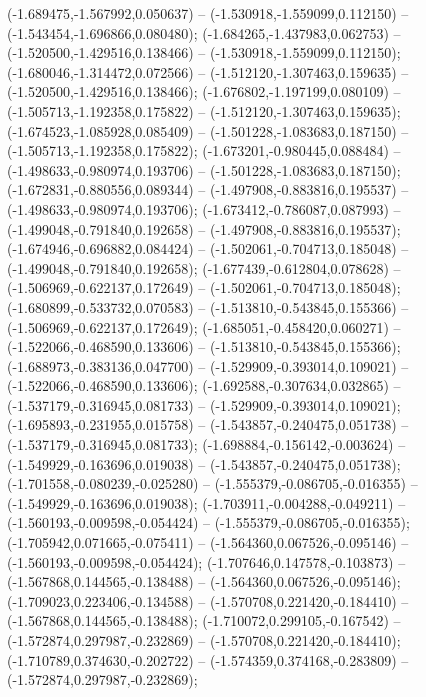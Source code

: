  (-1.689475,-1.567992,0.050637) -- (-1.530918,-1.559099,0.112150) -- (-1.543454,-1.696866,0.080480);
 (-1.684265,-1.437983,0.062753) -- (-1.520500,-1.429516,0.138466) -- (-1.530918,-1.559099,0.112150);
 (-1.680046,-1.314472,0.072566) -- (-1.512120,-1.307463,0.159635) -- (-1.520500,-1.429516,0.138466);
 (-1.676802,-1.197199,0.080109) -- (-1.505713,-1.192358,0.175822) -- (-1.512120,-1.307463,0.159635);
 (-1.674523,-1.085928,0.085409) -- (-1.501228,-1.083683,0.187150) -- (-1.505713,-1.192358,0.175822);
 (-1.673201,-0.980445,0.088484) -- (-1.498633,-0.980974,0.193706) -- (-1.501228,-1.083683,0.187150);
 (-1.672831,-0.880556,0.089344) -- (-1.497908,-0.883816,0.195537) -- (-1.498633,-0.980974,0.193706);
 (-1.673412,-0.786087,0.087993) -- (-1.499048,-0.791840,0.192658) -- (-1.497908,-0.883816,0.195537);
 (-1.674946,-0.696882,0.084424) -- (-1.502061,-0.704713,0.185048) -- (-1.499048,-0.791840,0.192658);
 (-1.677439,-0.612804,0.078628) -- (-1.506969,-0.622137,0.172649) -- (-1.502061,-0.704713,0.185048);
 (-1.680899,-0.533732,0.070583) -- (-1.513810,-0.543845,0.155366) -- (-1.506969,-0.622137,0.172649);
 (-1.685051,-0.458420,0.060271) -- (-1.522066,-0.468590,0.133606) -- (-1.513810,-0.543845,0.155366);
 (-1.688973,-0.383136,0.047700) -- (-1.529909,-0.393014,0.109021) -- (-1.522066,-0.468590,0.133606);
 (-1.692588,-0.307634,0.032865) -- (-1.537179,-0.316945,0.081733) -- (-1.529909,-0.393014,0.109021);
 (-1.695893,-0.231955,0.015758) -- (-1.543857,-0.240475,0.051738) -- (-1.537179,-0.316945,0.081733);
 (-1.698884,-0.156142,-0.003624) -- (-1.549929,-0.163696,0.019038) -- (-1.543857,-0.240475,0.051738);
 (-1.701558,-0.080239,-0.025280) -- (-1.555379,-0.086705,-0.016355) -- (-1.549929,-0.163696,0.019038);
 (-1.703911,-0.004288,-0.049211) -- (-1.560193,-0.009598,-0.054424) -- (-1.555379,-0.086705,-0.016355);
 (-1.705942,0.071665,-0.075411) -- (-1.564360,0.067526,-0.095146) -- (-1.560193,-0.009598,-0.054424);
 (-1.707646,0.147578,-0.103873) -- (-1.567868,0.144565,-0.138488) -- (-1.564360,0.067526,-0.095146);
 (-1.709023,0.223406,-0.134588) -- (-1.570708,0.221420,-0.184410) -- (-1.567868,0.144565,-0.138488);
 (-1.710072,0.299105,-0.167542) -- (-1.572874,0.297987,-0.232869) -- (-1.570708,0.221420,-0.184410);
 (-1.710789,0.374630,-0.202722) -- (-1.574359,0.374168,-0.283809) -- (-1.572874,0.297987,-0.232869);
